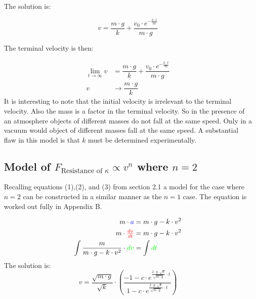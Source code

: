 The solution is:

\begin{equation}
v = \dfrac{m \cdot g}{k} + \dfrac{v_{0}\cdot \textit{e}^{-\tfrac{k \cdot t}{m}}}{m \cdot g}
\end{equation}

The terminal velocity is then:

\begin{equation}
\begin{align}
\lim_{t \to \infty} v &= \dfrac{m \cdot g}{k} + \dfrac{v_{0}\cdot \textit{e}^{-\tfrac{k \cdot t}{m}}}{m \cdot g}\\
					v &\to \dfrac{m \cdot g}{k}
\end{align}
\end{equation}
It is interesting to note that the initial velocity is irrelevant to the terminal velocity. Also the mass is a factor in the terminal velocity. So in the presence of an atmosphere objects of different masses do not fall at the same speed. Only in a vacuum would object of different masses fall at the same speed. A substantial flaw in this model is that $k$ must be determined experimentally.\\

\subsection{Model of $F_{\text{Resistance of }\kappa} \propto v^{n}$ where $n = 2$}

Recalling equations (1),(2), and (3) from section 2.1 a model for the case where $n = 2$ can be constructed in a similar manner as the $n = 1$ case. The equation is worked out fully in Appendix B.

\begin{equation}
\begin{align}
						m \cdot \color{blue}a\color{black} &= m \cdot g - k \cdot v^{2}\\
m\cdot \color{red}\tfrac{dv}{dt}\color{black} &= m \cdot g - k \cdot v^{2}\\
\int\dfrac{m}{m \cdot g - k \cdot v^{2}}\cdot \color{green}dv\color{black} &= \int \color{green}dt\color{black}\\
\end{align}
\end{equation}
The solution is:
\begin{equation}
v = \dfrac{\sqrt{m \cdot g}}{\sqrt{k}}\cdot \left(\dfrac{-1 - c \cdot\textit{e}^{\tfrac{2\cdot g \cdot\sqrt{k}}{\sqrt{m \cdot g}}\cdot t}}{1 - c \cdot\textit{e}^{\tfrac{2\cdot g \cdot\sqrt{k}}{\sqrt{m \cdot g}}\cdot t}}\right)
\end{equation}

